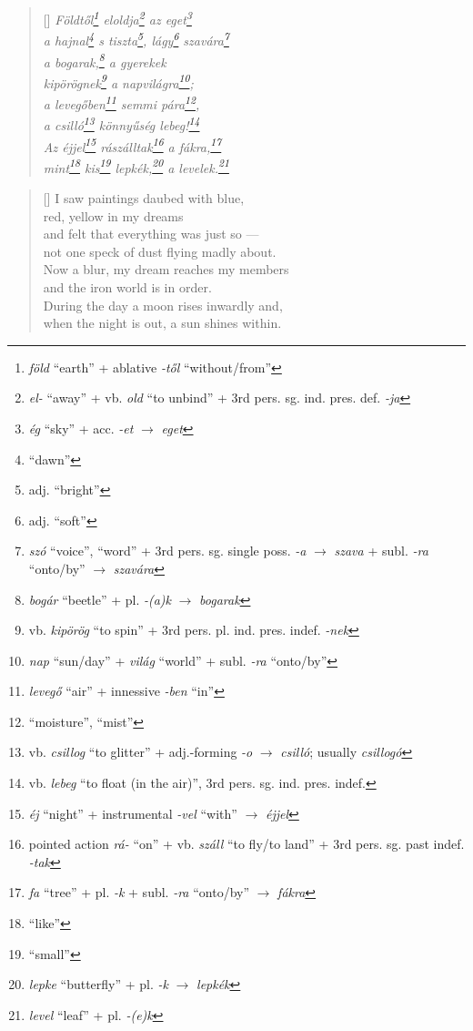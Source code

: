 \documentclass[a4paper,12pt,twoside,final]{book}
\begin{document}
\begin{verse}[\versewidth]
  \it
  Földtől\footnote{\emph{föld} ``earth'' +
  ablative \emph{-től} ``without/from''} eloldja\footnote{\emph{el-} ``away''
  + vb. \emph{old} ``to unbind'' + 3rd
  pers. sg. ind. pres. def. \emph{-ja}} az eget\footnote{\emph{ég}
  ``sky'' + acc. \emph{-et} $\rightarrow$ \emph{eget}} \\
  a hajnal\footnote{``dawn''} s tiszta\footnote{adj. ``bright''},
  lágy\footnote{adj. ``soft''} szavára\footnote{\emph{szó} ``voice'',
  ``word'' + 3rd pers. sg. single poss. \emph{-a} $\rightarrow$
  \emph{szava} + subl. \emph{-ra} ``onto/by'' $\rightarrow$
  \emph{szavára}} \\

  a bogarak,\footnote{\emph{bogár} ``beetle'' + pl. \emph{-(a)k}
  $\rightarrow$ \emph{bogarak}} a gyerekek \\
  kipörögnek\footnote{vb. \emph{kipörög} ``to spin'' + 3rd
  pers. pl. ind. pres. indef. \emph{-nek}}
  a napvilágra\footnote{\emph{nap} ``sun/day'' + \emph{világ}
  ``world'' + subl. \emph{-ra} ``onto/by''}; \\
  a levegőben\footnote{\emph{levegő} ``air'' +
  innessive \emph{-ben} ``in''} semmi pára\footnote{``moisture'', ``mist''}, \\
  a csilló\footnote{vb. \emph{csillog} ``to glitter'' +
  adj.-forming \emph{-o} $\rightarrow$
  \emph{csilló}; usually \emph{csillogó}} könnyűség
  lebeg!\footnote{vb. \emph{lebeg} ``to float (in the air)'', 3rd
  pers. sg. ind. pres. indef.} \\
  Az éjjel\footnote{\emph{éj} ``night'' + instrumental \emph{-vel}
  ``with'' $\rightarrow$ \emph{éjjel}} rászálltak\footnote{pointed
  action \emph{rá-} ``on'' + vb. \emph{száll} ``to fly/to
  land'' + 3rd pers. sg. past indef. \emph{-tak}} a
  fákra,\footnote{\emph{fa} ``tree'' +
  pl. \emph{-k} + subl. \emph{-ra} ``onto/by'' $\rightarrow$ \emph{fákra}} \\
  mint\footnote{``like''} kis\footnote{``small''} lepkék,\footnote{\emph{lepke}
  ``butterfly'' + pl. \emph{-k} $\rightarrow$ \emph{lepkék}} a
  levelek.\footnote{\emph{level} ``leaf'' + pl. \emph{-(e)k}}
\end{verse}

\newpage


\settowidth{\versewidth}{Now a blur, my dream reaches my members}

\begin{verse}[\versewidth]
  I saw paintings daubed with blue, \\
  red, yellow in my dreams \\
  and felt that everything was just so ---\\
  not one speck of dust flying madly about. \\
  Now a blur, my dream reaches my members \\
  and the iron world is in order. \\
  During the day a moon rises inwardly and, \\
  when the night is out, a sun shines within.
\end{verse}
\end{document}
